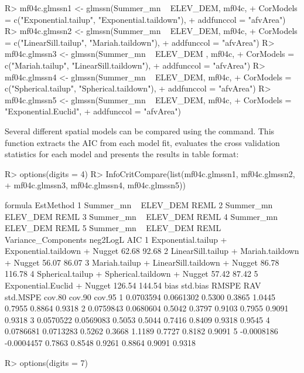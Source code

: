 \documentclass[nojss]{jss}
\renewenvironment{Schunk}{\vspace{\topsep}}{\vspace{\topsep}}
\begin{document}
\begin{Schunk}
\begin{Sinput}
R> mf04c.glmssn1 <- glmssn(Summer_mn ~ ELEV_DEM, mf04c,
+     CorModels = c("Exponential.tailup", "Exponential.taildown"),
+     addfunccol = "afvArea")
R> mf04c.glmssn2 <- glmssn(Summer_mn ~ ELEV_DEM,  mf04c,
+     CorModels = c("LinearSill.tailup", "Mariah.taildown"),
+     addfunccol = "afvArea")
R> mf04c.glmssn3 <- glmssn(Summer_mn ~ ELEV_DEM , mf04c,
+     CorModels =  c("Mariah.tailup", "LinearSill.taildown"),
+     addfunccol = "afvArea")
R> mf04c.glmssn4 <- glmssn(Summer_mn ~ ELEV_DEM, mf04c,
+     CorModels = c("Spherical.tailup", "Spherical.taildown"),
+     addfunccol = "afvArea")
R> mf04c.glmssn5 <- glmssn(Summer_mn ~ ELEV_DEM, mf04c,
+     CorModels = "Exponential.Euclid",
+     addfunccol = "afvArea")
\end{Sinput}
\end{Schunk}

Several different spatial models can be compared using the
 command. This function extracts the AIC from
each model fit, evaluates the cross validation statistics for each
model and presents the results in table format:

\begin{Schunk}
\begin{Sinput}
R> options(digits = 4)
R> InfoCritCompare(list(mf04c.glmssn1, mf04c.glmssn2,
+     mf04c.glmssn3, mf04c.glmssn4, mf04c.glmssn5))
\end{Sinput}
\begin{Soutput}
               formula EstMethod
1 Summer_mn ~ ELEV_DEM      REML
2 Summer_mn ~ ELEV_DEM      REML
3 Summer_mn ~ ELEV_DEM      REML
4 Summer_mn ~ ELEV_DEM      REML
5 Summer_mn ~ ELEV_DEM      REML
                                 Variance_Components neg2LogL    AIC
1 Exponential.tailup + Exponential.taildown + Nugget    62.68  92.68
2       LinearSill.tailup + Mariah.taildown + Nugget    56.07  86.07
3       Mariah.tailup + LinearSill.taildown + Nugget    86.78 116.78
4     Spherical.tailup + Spherical.taildown + Nugget    57.42  87.42
5                        Exponential.Euclid + Nugget   126.54 144.54
        bias   std.bias  RMSPE    RAV std.MSPE cov.80 cov.90 cov.95
1  0.0703594  0.0661302 0.5300 0.3865   1.0445 0.7955 0.8864 0.9318
2  0.0759843  0.0680604 0.5042 0.3797   0.9103 0.7955 0.9091 0.9318
3  0.0570522  0.0569083 0.5053 0.5044   0.7416 0.8409 0.9318 0.9545
4  0.0786681  0.0713283 0.5262 0.3668   1.1189 0.7727 0.8182 0.9091
5 -0.0008186 -0.0004457 0.7863 0.8548   0.9261 0.8864 0.9091 0.9318
\end{Soutput}
\begin{Sinput}
R> options(digits = 7)
\end{Sinput}
\end{Schunk}
\end{document}
